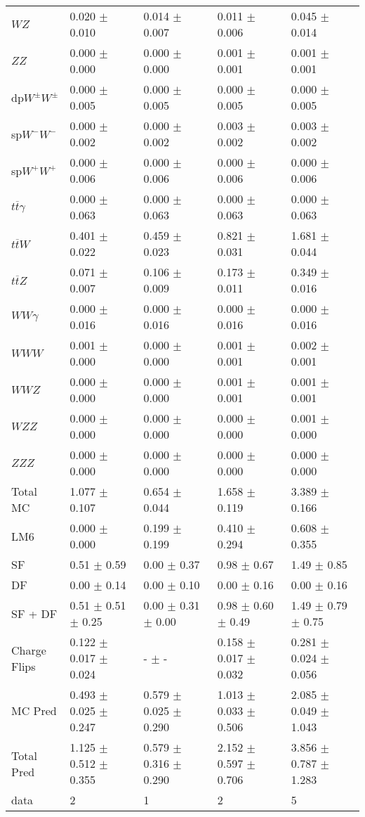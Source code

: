 \begin{tabular}{l | l l l l}
$WZ$ &  0.020 $\pm$  0.010 &  0.014 $\pm$  0.007 &  0.011 $\pm$  0.006 &  0.045 $\pm$  0.014\\
$ZZ$ &  0.000 $\pm$   0.000 &  0.000 $\pm$   0.000 &  0.001 $\pm$  0.001 &  0.001 $\pm$  0.001\\
\hline
dp$W^{\pm}W^{\pm}$ &  0.000 $\pm$  0.005 &  0.000 $\pm$  0.005 &  0.000 $\pm$  0.005 &  0.000 $\pm$  0.005\\
sp$W^{-}W^{-}$ &  0.000 $\pm$  0.002 &  0.000 $\pm$  0.002 &  0.003 $\pm$  0.002 &  0.003 $\pm$  0.002\\
sp$W^{+}W^{+}$ &  0.000 $\pm$  0.006 &  0.000 $\pm$  0.006 &  0.000 $\pm$  0.006 &  0.000 $\pm$  0.006\\
$t\overline{t}\gamma$ &  0.000 $\pm$  0.063 &  0.000 $\pm$  0.063 &  0.000 $\pm$  0.063 &  0.000 $\pm$  0.063\\
$t\overline{t}W$ &  0.401 $\pm$  0.022 &  0.459 $\pm$  0.023 &  0.821 $\pm$  0.031 &  1.681 $\pm$  0.044\\
$t\overline{t}Z$ &  0.071 $\pm$  0.007 &  0.106 $\pm$  0.009 &  0.173 $\pm$  0.011 &  0.349 $\pm$  0.016\\
$WW\gamma$ &  0.000 $\pm$  0.016 &  0.000 $\pm$  0.016 &  0.000 $\pm$  0.016 &  0.000 $\pm$  0.016\\
$WWW$ &  0.001 $\pm$   0.000 &   0.000 $\pm$   0.000 &  0.001 $\pm$  0.001 &  0.002 $\pm$  0.001\\
$WWZ$ &  0.000 $\pm$   0.000 &  0.000 $\pm$   0.000 &  0.001 $\pm$  0.001 &  0.001 $\pm$  0.001\\
$WZZ$ &   0.000 $\pm$   0.000 &   0.000 $\pm$   0.000 &   0.000 $\pm$   0.000 &  0.001 $\pm$   0.000\\
$ZZZ$ &   0.000 $\pm$   0.000 &   0.000 $\pm$   0.000 &   0.000 $\pm$   0.000 &   0.000 $\pm$   0.000\\
\hline
Total MC &  1.077 $\pm$  0.107 &  0.654 $\pm$  0.044 &  1.658 $\pm$  0.119 &  3.389 $\pm$  0.166\\
\hline\hline
\hline
LM6 &  0.000 $\pm$  0.000 &  0.199 $\pm$  0.199 &  0.410 $\pm$  0.294 &  0.608 $\pm$  0.355\\
\hline\hline
\hline\hline
 SF  & 0.51 $\pm$ 0.59 & 0.00 $\pm$ 0.37 & 0.98 $\pm$ 0.67 & 1.49 $\pm$ 0.85\\
 DF  & 0.00 $\pm$ 0.14 & 0.00 $\pm$ 0.10 & 0.00 $\pm$ 0.16 & 0.00 $\pm$ 0.16\\
\hline
 SF + DF  & 0.51 $\pm$ 0.51 $\pm$ 0.25 & 0.00 $\pm$ 0.31 $\pm$ 0.00 & 0.98 $\pm$ 0.60 $\pm$ 0.49 & 1.49 $\pm$ 0.79 $\pm$ 0.75\\
\hline\hline
Charge Flips & 0.122 $\pm$ 0.017 $\pm$ 0.024 & - $\pm$ - & 0.158 $\pm$ 0.017 $\pm$ 0.032 & 0.281 $\pm$ 0.024 $\pm$ 0.056\\
\hline\hline
\hline
MC Pred &  0.493 $\pm$  0.025 $\pm$  0.247 &  0.579 $\pm$  0.025 $\pm$  0.290 &  1.013 $\pm$  0.033 $\pm$  0.506 &  2.085 $\pm$  0.049 $\pm$  1.043\\
\hline\hline
Total Pred &  1.125 $\pm$  0.512 $\pm$  0.355 &  0.579 $\pm$  0.316 $\pm$  0.290 &  2.152 $\pm$  0.597 $\pm$  0.706 &  3.856 $\pm$  0.787 $\pm$  1.283\\
\hline\hline
data & 2 & 1 & 2 & 5\\
\hline\hline
\end{tabular}
